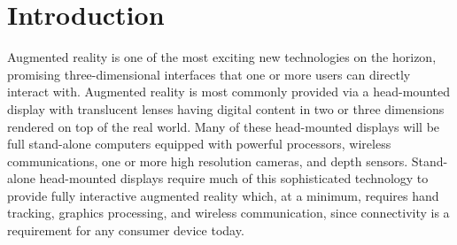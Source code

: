 \documentclass[12pt]{report}
\begin{document}
\chapter{Introduction}
Augmented reality is one of the most exciting new technologies on the horizon, promising three-dimensional interfaces that one or more users can directly interact with. Augmented reality is most commonly provided via a head-mounted display with translucent lenses having digital content in two or three dimensions rendered on top of the real world. Many of these head-mounted displays will be full stand-alone computers equipped with powerful processors, wireless communications, one or more high resolution cameras, and depth sensors. Stand-alone head-mounted displays require much of this sophisticated technology to provide fully interactive augmented reality which, at a minimum, requires hand tracking, graphics processing, and wireless communication, since connectivity is a requirement for any consumer device today. 
\end{document}
